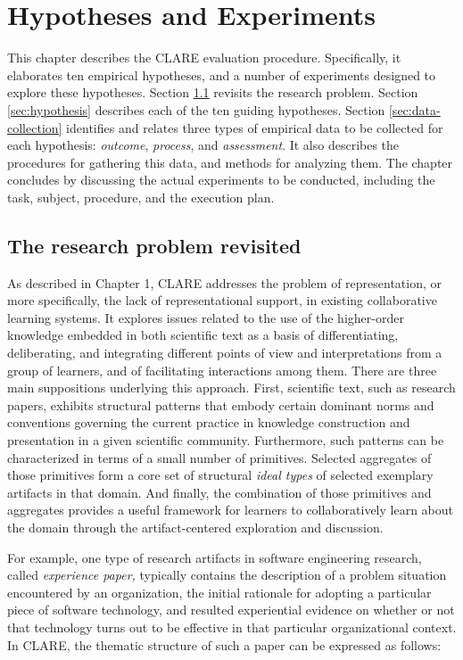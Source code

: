 \setcounter{chapter}{4}
\chapter{Hypotheses and Experiments}

This chapter describes the CLARE evaluation procedure. Specifically, it
elaborates ten empirical hypotheses, and a number of experiments designed
to explore these hypotheses. Section \ref{sec:problem-revisit} revisits the
research problem. Section \ref{sec:hypothesis} describes each of the ten
guiding hypotheses.  Section \ref{sec:data-collection} identifies and
relates three types of empirical data to be collected for each hypothesis:
{\it outcome\/}, {\it process\/}, and {\it assessment\/}. It also describes
the procedures for gathering this data, and methods for analyzing them. The
chapter concludes by discussing the actual experiments to be conducted,
including the task, subject, procedure, and the execution plan.


\section{The research problem revisited}
\label{sec:problem-revisit}

As described in Chapter 1, CLARE addresses the problem of representation,
or more specifically, the lack of representational support, in existing
collaborative learning systems. It explores issues related to the use of
the higher-order knowledge embedded in both scientific text as a basis of
differentiating, deliberating, and integrating different points of view and
interpretations from a group of learners, and of facilitating interactions
among them. There are three main suppositions underlying this approach.
First, scientific text, such as research papers, exhibits structural
patterns that embody certain dominant norms and conventions governing the
current practice in knowledge construction and presentation in a given
scientific community. Furthermore, such patterns can be characterized in
terms of a small number of primitives.  Selected aggregates of those
primitives form a core set of structural {\it ideal types\/} of selected
exemplary artifacts in that domain. And finally, the combination of those
primitives and aggregates provides a useful framework for learners to
collaboratively learn about the domain through the artifact-centered
exploration and discussion.

For example, one type of research artifacts in software engineering
research, called {\it experience paper,\/} typically contains the
description of a problem situation encountered by an organization, the
initial rationale for adopting a particular piece of software technology,
and resulted experiential evidence on whether or not that technology turns
out to be effective in that particular organizational context. In CLARE,
the thematic structure of such a paper can be expressed as follows:

